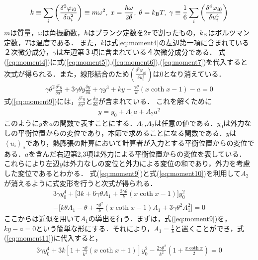 \begin{eqnarray}
\label{eq:moment8}
k \equiv 
\sum_i\left( \frac{\delta^2\varphi_{i0}}{\delta u_i^2}\right)
\equiv
m\omega^2, \;
x=\frac{\hbar\omega}{2\theta},\;
\theta = k_{\rm{B}}T,\;
\gamma\equiv\frac{1}{6}\sum_i\left( \frac{\delta^4\varphi_{i0}}{\delta u_i^4} \right)
\end{eqnarray}
$m$は質量，$\omega$は角振動数，$\hbar$はプランク定数を$2\pi$で割ったもの，$k_{\rm{B}}$はボルツマン定数，$T$は温度である．
また，$k$は式\ref{eq:moment4}の左辺第一項に含まれている２次微分成分，$\gamma$は左辺第３項に含まれている４次微分成分である．
式(\ref{eq:moment4})に式(\ref{eq:moment5}),(\ref{eq:moment6}),(\ref{eq:moment7})を代入すると次式が得られる．また，線形結合のため$\left( \frac{\delta^3\varphi_{i0}}{\delta u_i^3} \right)$は0となり消えている．
\begin{eqnarray}
\label{eq:moment9}
\gamma\theta^2 \frac{\delta^2y}{\delta a^2}
+3\gamma\theta y \frac{\delta y}{\delta a}
+\gamma y^3 + ky
+ \frac{\gamma \theta}{k}(x\coth x-1)-a=0
\end{eqnarray}
式(\ref{eq:moment9})には，$\frac{\delta^2y}{\delta a^2}$と$\frac{\delta y}{\delta a}$が含まれている．
これを解くために
\begin{eqnarray}
\label{eq:moment10}
y=y_0+A_1a+A_2a^2
\end{eqnarray}
このように$y$を$a$の関数で表すことにする．$A_1$,$A_2$は任意の値である．$y_0$は外力なしの平衡位置からの変位であり，本節で求めることになる関数である．$y$は$\left<u_i\right>_a$であり，熱膨張の計算において計算者が入力とする平衡位置からの変位である．$a$を含んだ右辺第2,3項は外力による平衡位置からの変位を表している．
これらにより左辺$y$は外力なしの変位と外力による変位の和であり，外力を考慮した変位であるとわかる．
式(\ref{eq:moment9})と式(\ref{eq:moment10})を利用して$A_2$が消えるように式変形を行うと次式が得られる．
\begin{eqnarray}
\label{eq:moment11}
3\gamma y_0^4+\Big[3k+6\gamma \theta A_1+\frac{3\gamma \theta}{k}(x\coth x-1) \Big] y_0^2\nonumber \\ 
-\Big[k\theta A_1-\theta + \frac{\gamma \theta^2}{k}(x \coth x -1)A_1+3\gamma \theta^2 A_1^2 \Big]=0
\end{eqnarray}
ここからは近似を用いて$A_1$の導出を行う．まずは，式(\ref{eq:moment9})を，$ky-a=0$という簡単な形にする．それにより，$A_1=\frac{1}{k}$と置くことができ，式(\ref{eq:moment11})に代入すると，
\begin{eqnarray}
\label{eq:moment12}
3\gamma y_0^4+3k\left[1+ \frac{\gamma \theta}{k^2}(x\coth x+1)\right]y_0^2
  -\frac{2\gamma \theta^2}{k^2}\left(
    1+\frac{x \coth x}{2}
   \right)=0
\end{eqnarray}
